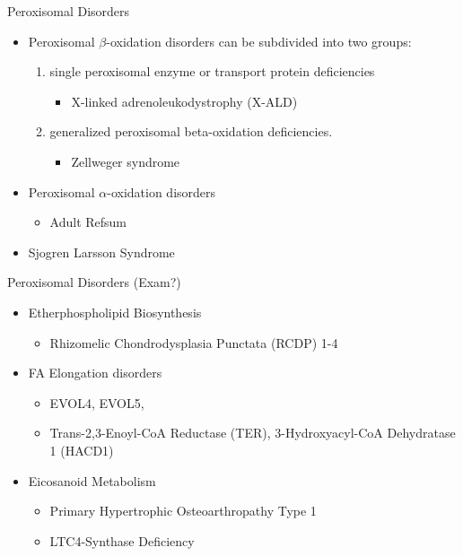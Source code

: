 \documentclass[presentation, smaller]{beamer}
\begin{document}
\begin{frame}[label={sec:orge2a52b7}]{Peroxisomal Disorders}
\begin{itemize}
\item Peroxisomal \(\beta\)-oxidation disorders can be subdivided into two groups:
\begin{enumerate}
\item single peroxisomal enzyme or transport protein deficiencies
\begin{itemize}
\item X-linked adrenoleukodystrophy (X-ALD)
\end{itemize}
\item generalized peroxisomal beta-oxidation deficiencies.
\begin{itemize}
\item Zellweger syndrome
\end{itemize}
\end{enumerate}

\item Peroxisomal \(\alpha\)-oxidation disorders
\begin{itemize}
\item Adult Refsum
\end{itemize}
\item Sjogren Larsson Syndrome
\end{itemize}
\end{frame}

\begin{frame}[label={sec:org599ee13}]{Peroxisomal Disorders (Exam?)}
\begin{itemize}
\item Etherphospholipid Biosynthesis
\begin{itemize}
\item Rhizomelic Chondrodysplasia Punctata (RCDP) 1-4
\end{itemize}
\item FA Elongation disorders
\begin{itemize}
\item EVOL4, EVOL5,
\item Trans-2,3-Enoyl-CoA Reductase (TER), 3-Hydroxyacyl-CoA Dehydratase 1 (HACD1)
\end{itemize}
\item Eicosanoid Metabolism
\begin{itemize}
\item Primary Hypertrophic Osteoarthropathy Type 1
\item LTC4-Synthase Deficiency
\end{itemize}
\end{itemize}
\end{frame}
\end{document}
